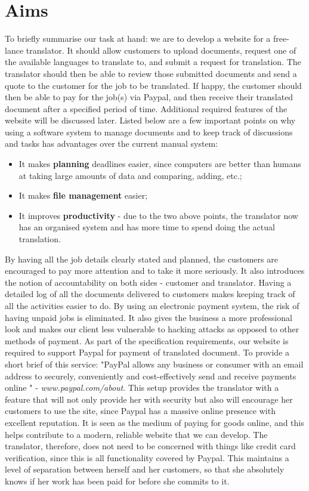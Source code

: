 \documentclass{l3proj}
\begin{document}
\section{Aims}
To briefly summarise our task at hand: we are to develop a website for a free-lance translator. It should allow customers to upload documents, request one of the available languages to translate to, and submit a request for translation. The translator should then be able to review those submitted documents and send a quote to the customer for the job to be translated. If happy, the customer should then be able to pay for the job(s) via Paypal, and then receive their translated document after a specified period of time. Additional required features of the website will be discussed later. Listed below are a few important points on why using a software system to manage documents and to keep track of discussions and tasks has advantages over the current manual system:

\begin{itemize}
	\item
	It makes {\bf planning} deadlines easier, since computers are better than humans
	at taking large amounts of data and comparing, adding, etc.;
	\item
	It makes {\bf file management} easier;
	\item
	It improves {\bf productivity} - due to the two above points, the translator now has an organised system and has more time to spend doing the actual translation.
\end{itemize}

By having all the job details clearly stated and planned, the customers are encouraged to pay more attention and to take it more seriously. It also introduces the notion of accountability on both sides - customer and translator. Having a detailed log of all the documents delivered to customers makes keeping track of all the activities easier to do. By using an electronic payment system, the risk of having unpaid jobs is eliminated. It also gives the business a more professional look and makes our client less vulnerable to hacking attacks as opposed to other methods of payment. As part of the specification requirements, our website is required to support Paypal for payment of translated document. To provide a short brief of this service: "PayPal allows any business or consumer with an email address to securely, conveniently and cost-effectively send and receive payments online " - \textit{\small{www.paypal.com/about}}. This setup provides the translator with a feature that will not only provide her with security but also will encourage her customers to use the site, since Paypal has a massive online presence with excellent reputation. It is seen as the medium of paying for goods online, and this helps contribute to a modern, reliable website that we can develop. The translator, therefore, does not need to be concerned with things like credit card verification, since this is all functionality covered by Paypal. This maintains a level of separation between herself and her customers, so that she absolutely knows if her work has been paid for before she commits to it. \\
\end{document}
